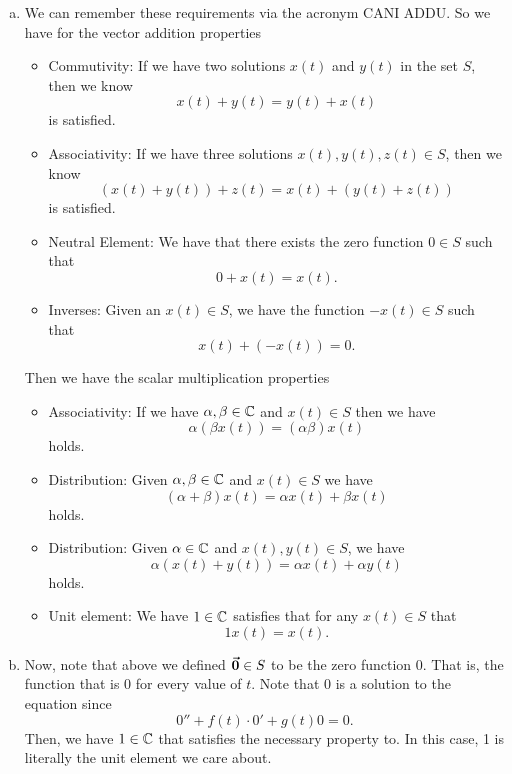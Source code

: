 \documentclass[12pt]{article} %
\begin{document}
\begin{solution}
\begin{enumerate}[(a)]
    \item We can remember these requirements via the acronym CANI ADDU.  So we have for the vector addition properties
    \begin{itemize}
        \item Commutivity: If we have two solutions $x(t)$ and $y(t)$ in the set $S$, then we know 
        \[
        x(t)+y(t)=y(t)+x(t)
        \]
        is satisfied.
        \item Associativity: If we have three solutions $x(t),y(t),z(t)\in S$, then we know
        \[
        (x(t)+y(t))+z(t)=x(t) + (y(t)+z(t))
        \]
        is satisfied.
        \item Neutral Element: We have that there exists the zero function $0\in S$ such that
        \[
        0+x(t)=x(t).
        \]
        \item Inverses: Given an $x(t)\in S$, we have the function $-x(t)\in S$ such that
        \[
        x(t)+(-x(t))=0.
        \]
    \end{itemize}
    Then we have the scalar multiplication properties
    \begin{itemize}
        \item Associativity: If we have $\alpha,\beta \in \mathbb{C}$ and $x(t)\in S$ then we have
        \[
        \alpha (\beta x(t)) = (\alpha \beta)x(t)
        \]
        holds.
        \item Distribution: Given $\alpha,\beta \in \mathbb{C}$ and $x(t)\in S$ we have
        \[
        (\alpha +\beta)x(t) = \alpha x(t) + \beta x(t)
        \]
        holds.
        \item Distribution: Given $\alpha\in \mathbb{C}$ and $x(t),y(t)\in S$, we have
        \[
        \alpha(x(t)+y(t))=\alpha x(t) + \alpha y(t)
        \]
        holds.
        \item Unit element: We have $1\in \mathbb{C}$ satisfies that for any $x(t)\in S$ that
        \[
        1 x(t) = x(t).
        \]
    \end{itemize}
    \item Now, note that above we defined $\boldsymbol{\vec{0}}\in S$ to be the zero function 0. That is, the function that is 0 for every value of $t$. Note that $0$ is a solution to the equation since
    \[
    0'' + f(t)\cdot 0' + g(t) 0 = 0.
    \]
    Then, we have $1\in \mathbb{C}$ that satisfies the necessary property to. In this case, 1 is literally the unit element we care about.  
    

\end{enumerate}
\end{solution}
\end{document}

